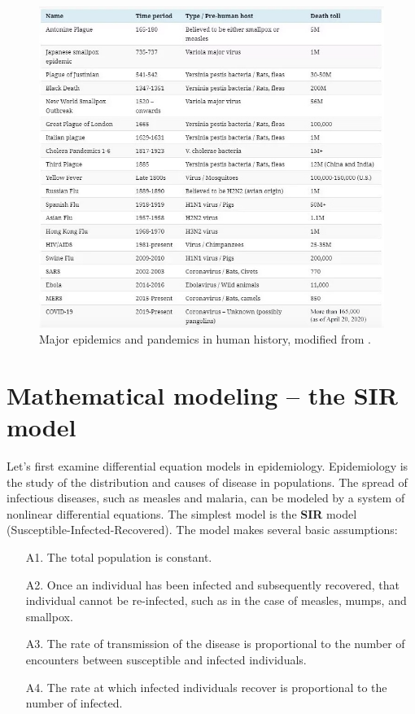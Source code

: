 \documentclass[10pt,letterpaper]{article}
\begin{document}
\begin{figure}[!htb]
\includegraphics[width=6in]{pandemics2.jpg}
\centering
\caption{\label{fig:pandemics}Major epidemics and pandemics in human history, modified from \cite{Pandemic2020}.}
\end{figure}

\section*{Mathematical modeling -- the SIR model}
Let's first examine differential equation models in epidemiology. Epidemiology is the study of the distribution and causes of disease in populations. The spread of infectious diseases, such as measles and malaria, can be modeled by a system of nonlinear differential equations. The simplest model is the {\bf SIR} model (Susceptible-Infected-Recovered). The model makes several basic assumptions:
\begin{enumerate}
\item[A1.] The total population is constant.
\item[A2.] Once an individual has been infected and subsequently recovered, that individual cannot be re-infected, such as in the case of measles, mumps, and smallpox.
\item[A3.] The rate of transmission of the disease is proportional to the number of encounters between susceptible and infected individuals.
\item[A4.] The rate at which infected individuals recover is proportional to the number of infected.
\end{enumerate}
\end{document}
